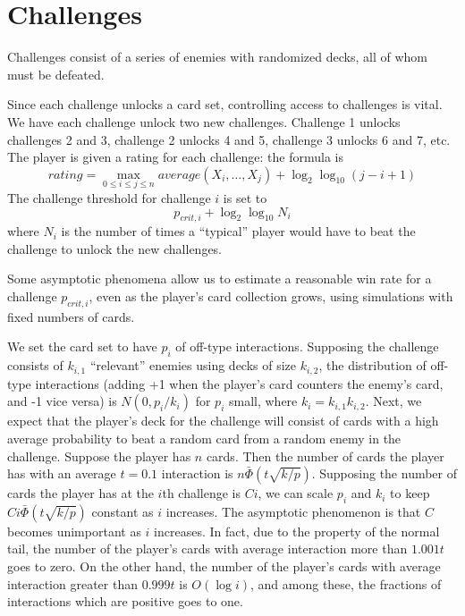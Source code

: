 \documentclass[11pt]{article}
\begin{document}
\section{Challenges}

Challenges consist of a series of enemies with randomized decks, all of whom must be defeated.

Since each challenge unlocks a card set, controlling access to challenges is vital.
We have each challenge unlock two new challenges.
Challenge 1 unlocks challenges 2 and 3, challenge 2 unlocks 4 and 5, challenge 3 unlocks 6 and 7, etc.
The player is given a rating for each challenge:
the formula is
\[
rating = \max_{0 \leq i \leq j \leq n} average(X_i,\hdots,X_j) + \log_2 \log_{10} (j-i+1)
\]
The challenge threshold for challenge $i$ is set to
\[
p_{crit,i} + \log_2 \log_{10} N_i
\]
where $N_i$ is the number of times a ``typical'' player would have to beat the challenge to unlock the new challenges.

Some asymptotic phenomena allow us to estimate a reasonable win rate for a challenge $p_{crit,i}$, even as the player's card collection grows, using simulations with fixed numbers of cards.

We set the card set to have $p_i$ of off-type interactions.
Supposing the challenge consists of $k_{i,1}$ ``relevant'' enemies using decks of size $k_{i,2}$, the distribution of off-type interactions (adding +1 when the player's card counters the enemy's card, and -1 vice versa) is $N(0,p_i/k_i)$ for $p_i$ small, where $k_i=k_{i,1}k_{i,2}$.
Next, we expect that the player's deck for the challenge will consist of cards with a high average probability to beat a random card from a random enemy in the challenge.
Suppose the player has $n$ cards.
Then the number of cards the player has with an average $t=0.1$ interaction is $n\bar{\Phi}(t \sqrt{k/p})$.
Supposing the number of cards the player has at the $i$th challenge is $Ci$, we can scale $p_i$ and $k_i$ to keep $Ci\bar{\Phi}(t \sqrt{k/p})$ constant as $i$ increases.
The asymptotic phenomenon is that $C$ becomes unimportant as $i$ increases.
In fact, due to the property of the normal tail, the number of the player's cards with average interaction more than $1.001 t$ goes to zero.
On the other hand, the number of the player's cards with average interaction greater than $0.999 t$
is $O(\log i)$, and among these, the fractions of interactions which are positive goes to one.
\end{document}
